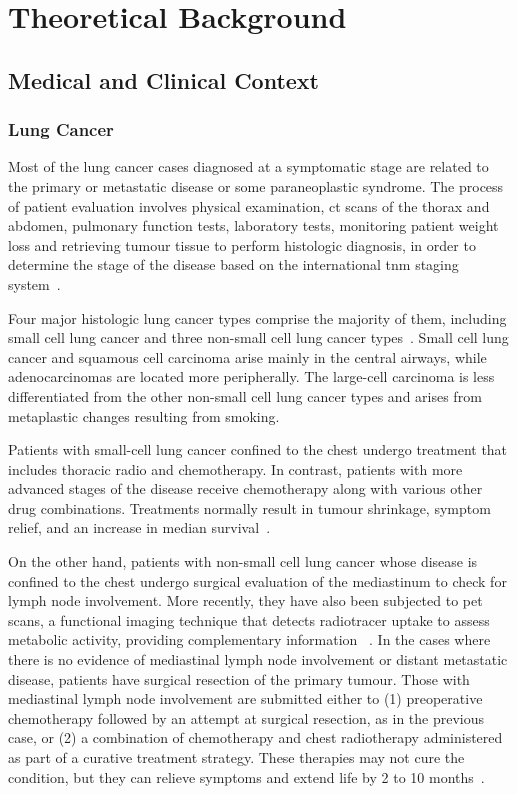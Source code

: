 \chapter{Theoretical Background}\label{chap:background}

\section{Medical and Clinical Context}\label{sec:med_context}

\subsection{Lung Cancer}

Most of the lung cancer cases diagnosed at a symptomatic stage are related to the primary or metastatic disease or some paraneoplastic syndrome. The process of patient evaluation involves physical examination, \ac{ct} scans of the thorax and abdomen, pulmonary function tests, laboratory tests, monitoring patient weight loss and retrieving tumour tissue to perform histologic diagnosis, in order to determine the stage of the disease based on the international \ac{tnm} staging system~\cite{minna_focus_2002, watanabe_tnm_2003}.

Four major histologic lung cancer types comprise the majority of them, including small cell lung cancer and three non-small cell lung cancer types~\cite{travis_pathology_2011}.
Small cell lung cancer and squamous cell carcinoma arise mainly in the central airways, while adenocarcinomas are located more peripherally. The large-cell carcinoma is less differentiated from the other non-small cell lung cancer types and arises from metaplastic changes resulting from smoking.

Patients with small-cell lung cancer confined to the chest undergo treatment that includes thoracic radio and chemotherapy. In contrast, patients with more advanced stages of the disease receive chemotherapy along with various other drug combinations. Treatments normally result in tumour shrinkage, symptom relief, and an increase in median survival~\cite{minna_focus_2002}.

On the other hand, patients with non-small cell lung cancer whose disease is confined to the chest undergo surgical evaluation of the mediastinum to check for lymph node involvement. More recently, they have also been subjected to \ac{pet} scans, a functional imaging technique that detects radiotracer uptake to assess metabolic activity, providing complementary information ~\cite{buzug_computed_2011}.
In the cases where there is no evidence of mediastinal lymph node involvement or distant metastatic disease, patients have surgical resection of the primary tumour. Those with mediastinal lymph node involvement are submitted either to (1) preoperative chemotherapy followed by an attempt at surgical resection, as in the previous case, or (2) a combination of chemotherapy and chest radiotherapy administered as part of a curative treatment strategy. These therapies may not cure the condition, but they can relieve symptoms and extend life by 2 to 10 months~\cite{minna_focus_2002}.


